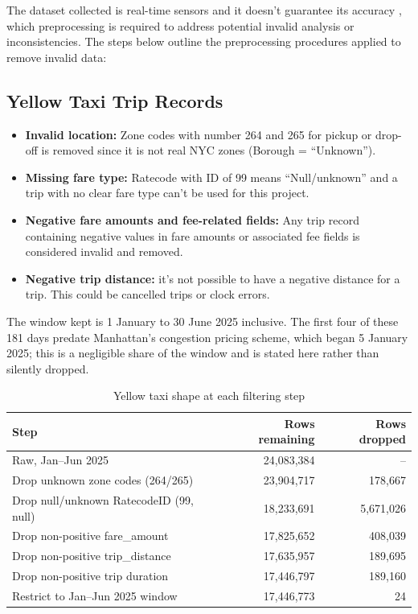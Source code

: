 \documentclass[11pt]{article}
\begin{document}
The dataset collected is real-time sensors and it doesn't guarantee its accuracy
\citep{tlc-trip-data}, which preprocessing is required to address potential invalid
analysis or inconsistencies. The steps below outline the preprocessing procedures
applied to remove invalid data:

\subsection{Yellow Taxi Trip Records}

\begin{itemize}
  \item \textbf{Invalid location:} Zone codes with number 264 and 265 for pickup or
    drop-off is removed since it is not real NYC zones (Borough = ``Unknown'').
  \item \textbf{Missing fare type:} Ratecode with ID of 99 means ``Null/unknown''
    \citep{tlc-yellow-dict} and a trip with no clear fare type can't be used for this
    project.
  \item \textbf{Negative fare amounts and fee-related fields:} Any trip record
    containing negative values in fare amounts or associated fee fields is considered
    invalid and removed.
  \item \textbf{Negative trip distance:} it's not possible to have a negative distance
    for a trip. This could be cancelled trips or clock errors.
\end{itemize}

The window kept is 1 January to 30 June 2025 inclusive. The first four of these 181
days predate Manhattan's congestion pricing scheme, which began 5 January 2025; this
is a negligible share of the window and is stated here rather than silently dropped.

\begin{table}[h]
\centering
\caption{Yellow taxi shape at each filtering step}
\label{tab:yellow-shape}
\small
\begin{tabular}{lrr}
\toprule
Step & Rows remaining & Rows dropped \\
\midrule
Raw, Jan--Jun 2025 & 24,083,384 & -- \\
Drop unknown zone codes (264/265) & 23,904,717 & 178,667 \\
Drop null/unknown RatecodeID (99, null) & 18,233,691 & 5,671,026 \\
Drop non-positive fare\_amount & 17,825,652 & 408,039 \\
Drop non-positive trip\_distance & 17,635,957 & 189,695 \\
Drop non-positive trip duration & 17,446,797 & 189,160 \\
Restrict to Jan--Jun 2025 window & 17,446,773 & 24 \\
\bottomrule
\end{tabular}
\end{table}
\end{document}

